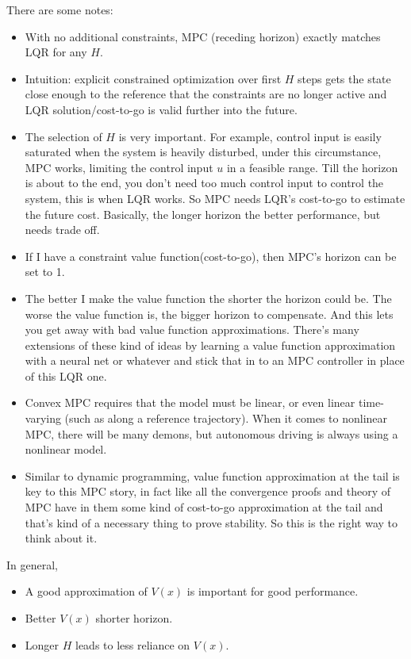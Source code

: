 There are some notes:
\begin{itemize}
    \item With no additional constraints, MPC (receding horizon) exactly matches LQR for any $H$.
    \item Intuition: explicit constrained optimization over first $H$ steps gets the state close enough to the reference that the constraints are no longer active and LQR solution/cost-to-go is valid further into the future.
    \item The selection of $H$ is very important. For example, control input is easily saturated when the system is heavily disturbed, under this circumstance, MPC works, limiting the control input $u$ in a feasible range. Till the horizon is about to the end, you don't need too much control input to control the system, this is when LQR works. So MPC needs LQR's cost-to-go to estimate the future cost. Basically, the longer horizon the better performance, but needs trade off. 
    \item If I have a constraint value function(cost-to-go), then MPC's horizon can be set to 1.
    \item The better I make the value function the shorter the horizon could be. The worse the value function is, the bigger horizon to compensate. And this lets you get away with bad value function approximations. There's many extensions of these kind of ideas by learning a value function approximation with a neural net or whatever and stick that in to an MPC controller in place of this LQR one.
    \item Convex MPC requires that the model must be linear, or even linear time-varying (such as along a reference trajectory). When it comes to nonlinear MPC, there will be many demons, but autonomous driving is always using a nonlinear model.
    \item Similar to dynamic programming, value function approximation at the tail is key to this MPC story, in fact like all the convergence proofs and theory of MPC have in them some kind of cost-to-go approximation at the tail and that's kind of a necessary thing to prove stability. So this is the right way to think about it.
\end{itemize}

In general, 
\begin{itemize}
    \item A good approximation of $V(x)$ is important for good performance.
    \item Better $V(x)$  shorter horizon.
    \item Longer $H$ leads to less reliance on $V(x)$.
\end{itemize}

